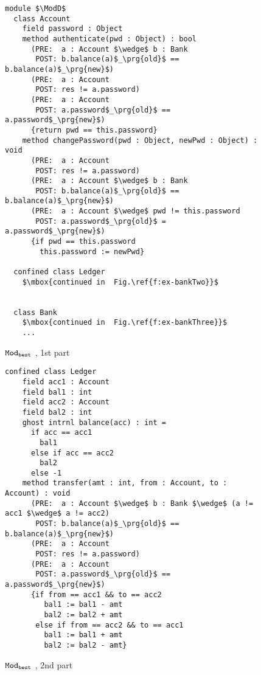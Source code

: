 \begin{figure}[htb]
\begin{lstlisting}[language=chainmail, mathescape=true, frame=lines]
module $\ModD$
  class Account
    field password : Object
    method authenticate(pwd : Object) : bool
      (PRE:  a : Account $\wedge$ b : Bank
       POST: b.balance(a)$_\prg{old}$ == b.balance(a)$_\prg{new}$)
      (PRE:  a : Account
       POST: res != a.password)
      (PRE:  a : Account
       POST: a.password$_\prg{old}$ == a.password$_\prg{new}$)
      {return pwd == this.password}
    method changePassword(pwd : Object, newPwd : Object) : void
      (PRE:  a : Account
       POST: res != a.password)
      (PRE:  a : Account $\wedge$ b : Bank
       POST: b.balance(a)$_\prg{old}$ == b.balance(a)$_\prg{new}$)
      (PRE:  a : Account $\wedge$ pwd != this.password
       POST: a.password$_\prg{old}$ = a.password$_\prg{new}$)
      {if pwd == this.password
        this.password := newPwd}

  confined class Ledger
    $\mbox{continued in  Fig.\ref{f:ex-bankTwo}}$
      

  class Bank
    $\mbox{continued in  Fig.\ref{f:ex-bankThree}}$
    ...
\end{lstlisting}
\caption{${\texttt{Mod}}_{{\texttt{best}}}$ \funcSpecs, 1st part}
\label{f:ex-bankOne}
\end{figure}

\begin{figure}[htb]
\begin{lstlisting}[language=chainmail, mathescape=true, frame=lines]
  confined class Ledger
    field acc1 : Account
    field bal1 : int
    field acc2 : Account
    field bal2 : int
    ghost intrnl balance(acc) : int = 
      if acc == acc1
        bal1
      else if acc == acc2
        bal2
      else -1
    method transfer(amt : int, from : Account, to : Account) : void
      (PRE:  a : Account $\wedge$ b : Bank $\wedge$ (a != acc1 $\wedge$ a != acc2)
       POST: b.balance(a)$_\prg{old}$ == b.balance(a)$_\prg{new}$)
      (PRE:  a : Account
       POST: res != a.password)
      (PRE:  a : Account
       POST: a.password$_\prg{old}$ == a.password$_\prg{new}$)
      {if from == acc1 && to == acc2
         bal1 := bal1 - amt
         bal2 := bal2 + amt
       else if from == acc2 && to == acc1
         bal1 := bal1 + amt
         bal2 := bal2 - amt}
\end{lstlisting}
\caption{${\texttt{Mod}}_{{\texttt{best}}}$ \funcSpecs, 2nd part}
\label{f:ex-bankTwo}
\end{figure}


